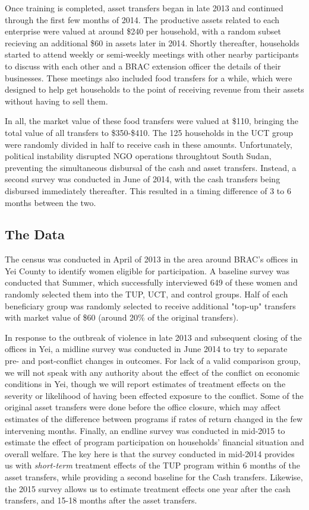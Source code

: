 \documentclass[12pt,article]{article}
\begin{document}
Once training is completed, asset transfers began in late 2013 and continued through
the first few months of 2014. The productive assets related to each enterprise were
valued at around \$240 per household, with a random subset recieving an additional \$60
in assets later in 2014. Shortly thereafter, households started to attend weekly or
semi-weekly meetings with other nearby participants to discuss with each other and a
BRAC extension officer the details of their businesses. These meetings also included
food transfers for a while, which were designed to help get households to the point
of receiving revenue from their assets without having to sell them.

In all, the market value of these food transfers were valued at \$110, bringing the
total value of all transfers to \$350-\$410. The 125 households in the UCT group were
randomly divided in half to receive cash in these amounts. Unfortunately, political
instability disrupted NGO operations throughtout South Sudan, preventing the
simultaneous disbursal of the cash and asset transfers. Instead, a second survey was
conducted in June of 2014, with the cash transfers being disbursed immediately
thereafter. This resulted in a timing difference of 3 to 6 months between the two.

\subsection{The Data}
\label{sec-2-1}

The census was conducted in April of 2013 in the area around BRAC's offices in Yei
County to identify women eligible for participation. A baseline survey was conducted
that Summer, which successfully interviewed 649 of these women and randomly selected
them into the TUP, UCT, and control groups. Half of each beneficiary group was
randomly selected to receive additional "top-up" transfers with market value of \$60
(around 20\% of the original transfers).

In response to the outbreak of violence in late 2013 and subsequent closing of the
offices in Yei, a midline survey was conducted in June 2014 to try to separate pre-
and post-conflict changes in outcomes. For lack of a valid comparison group, we will
not speak with any authority about the effect of the conflict on economic conditions
in Yei, though we will report estimates of treatment effects on the severity or
likelihood of having been effected exposure to the conflict. Some of the original
asset transfers were done before the office closure, which may affect estimates of
the difference between programs if rates of return changed in the few intervening
months. Finally, an endline survey was conducted in mid-2015 to estimate the effect
of program participation on households' financial situation and overall welfare. The
key here is that the survey conducted in mid-2014 provides us with \emph{short-term}
treatment effects of the TUP program within 6 months of the asset transfers, while
providing a second baseline for the Cash transfers. Likewise, the 2015 survey
allows us to estimate treatment effects one year after the cash transfers, and 15-18
months after the asset transfers.
\end{document}
